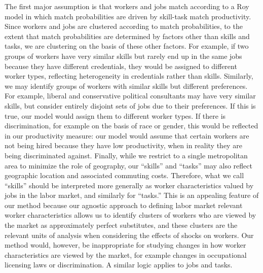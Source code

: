 \documentclass[12pt]{article}
\theoremstyle{definition}
\theoremstyle{plain}
\begin{document}
The first major assumption is that workers and jobs match according to a Roy model in which match probabilities are driven by skill-task match productivity. Since workers and jobs are clustered according to match probabilities, to the extent that match probabilities are determined by factors other than skills and tasks, we are clustering on the basis of these other factors. For example, if two groups of workers have very similar skills but rarely end up in the same jobs because they have different credentials, they would be assigned to different worker types, reflecting heterogeneity in credentials rather than skills. Similarly, we may identify groups of workers with similar skills but different preferences. For example, liberal and conservative political consultants may have very similar skills, but consider entirely disjoint sets of jobs due to their preferences. If this is true, our model would assign them to different worker types. If there is discrimination, for example on the basis of race or gender, this would be reflected in our productivity measure: our model would assume that certain workers are not being hired because they have low productivity, when in reality they are being discriminated against. Finally, while we restrict to a single metropolitan area to minimize the role of geography, our ``skills'' and ``tasks'' may also reflect geographic location and associated commuting costs. Therefore, what we call ``skills'' should be interpreted more generally as worker characteristics valued by jobs in the labor market, and similarly for ``tasks.'' This is an appealing feature of our method because our agnostic approach to defining labor market relevant worker characteristics allows us to identify clusters of workers who are viewed by the market as approximately perfect substitutes, and these clusters are the relevant units of analysis when considering the effects of shocks on workers. Our method would, however, be inappropriate for studying changes in how worker characteristics are viewed by the market, for example changes in occupational licensing laws or discrimination.  A similar logic applies to jobs and tasks.
\end{document}
